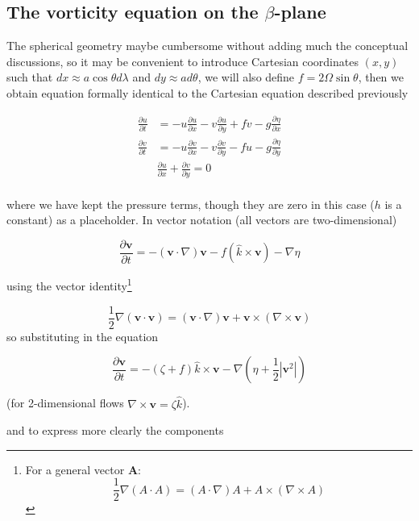 \subsection{\texorpdfstring{The vorticity equation on the
\(\beta\)-plane}{The vorticity equation on the \textbackslash beta-plane}}\label{the-vorticity-equation-on-the-beta-plane}

The spherical geometry maybe cumbersome without adding much the
conceptual discussions, so it may be convenient to introduce Cartesian
coordinates \((x,y)\) such that \(dx \approx a \cos\theta d \lambda\)
and \(dy \approx a d\theta\), we will also define
\(f= 2\Omega \sin\theta\), then we obtain equation formally identical to
the Cartesian equation described previously

\[\begin{aligned}
\frac{\partial u}{\partial t} &= -u \frac{\partial u}{\partial x} -v \frac{\partial u}{\partial y} + f v -g\frac{\partial \eta}{\partial x} \\
\frac{\partial v}{\partial t} &= -u \frac{\partial v}{\partial x} -v \frac{\partial v}{\partial y} - f u -g\frac{\partial \eta}{\partial y} \\
&\frac{\partial u}{\partial x}+\frac{\partial v}{\partial y} = 0 \\
\end{aligned}\]

where we have kept the pressure terms, though they are zero in this case
($h$ is a constant) as a placeholder. In vector notation (all vectors are
two-dimensional)

\[\frac{\partial \mathbf{v}}{\partial t} = - (\mathbf{v} \cdot \nabla)\mathbf{v} - f(\hat{k}\times \mathbf{v}) - \nabla \eta\]

using the vector identity\footnote{For a general vector $\mathbf{A}$: \[\frac{1}{2}\nabla(A\cdot A) = (A \cdot\nabla)A + A\times(\nabla\times A)\]}


\[\frac{1}{2}\nabla(\mathbf{v}\cdot \mathbf{v}) = (\mathbf{v} \cdot\nabla)\mathbf{v} + \mathbf{v}\times(\nabla\times \mathbf{v})\]
so substituting in the equation

\begin{equation}\label{eq.21}
    \frac{\partial \mathbf{v}}{\partial t} = -(\zeta + f) \hat{k}\times \mathbf{v} -\nabla(\eta+\frac{1}{2}|\mathbf{v}^2|)
\end{equation}

(for 2-dimensional flows \(\nabla \times \mathbf{v} = \zeta \hat{k}\)).

and to express more clearly the components

